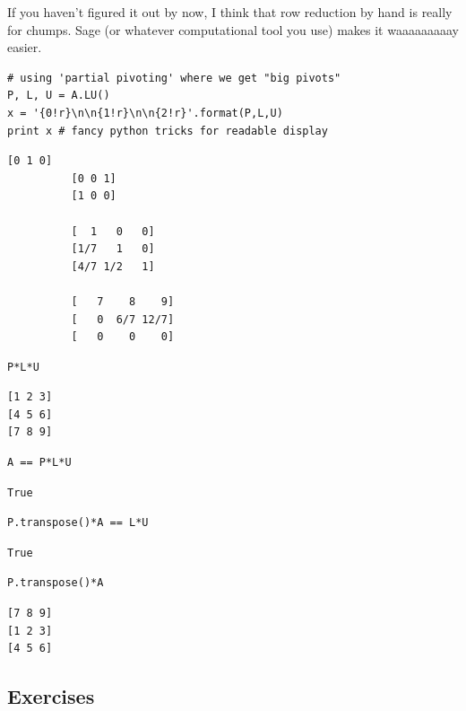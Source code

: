 \documentclass[10pt,]{book}
\theoremstyle{plain}
\theoremstyle{definition}
\numberwithin{equation}{section}
\begin{document}
        If you haven't figured it out by now, I think that row reduction by hand
        is really for chumps. Sage (or whatever computational tool you use) makes
        it waaaaaaaaay easier.
\begin{lstlisting}[style=sageinput]
# using 'partial pivoting' where we get "big pivots"
P, L, U = A.LU()
x = '{0!r}\n\n{1!r}\n\n{2!r}'.format(P,L,U)
print x # fancy python tricks for readable display
\end{lstlisting}
\begin{lstlisting}[style=sageoutput]
          [0 1 0]
          [0 0 1]
          [1 0 0]

          [  1   0   0]
          [1/7   1   0]
          [4/7 1/2   1]

          [   7    8    9]
          [   0  6/7 12/7]
          [   0    0    0]
\end{lstlisting}
\begin{lstlisting}[style=sageinput]
P*L*U
\end{lstlisting}
\begin{lstlisting}[style=sageoutput]
[1 2 3]
[4 5 6]
[7 8 9]
\end{lstlisting}
\begin{lstlisting}[style=sageinput]
A == P*L*U
\end{lstlisting}
\begin{lstlisting}[style=sageoutput]
True
\end{lstlisting}
\begin{lstlisting}[style=sageinput]
P.transpose()*A == L*U
\end{lstlisting}
\begin{lstlisting}[style=sageoutput]
True
\end{lstlisting}
\begin{lstlisting}[style=sageinput]
P.transpose()*A
\end{lstlisting}
\begin{lstlisting}[style=sageoutput]
[7 8 9]
[1 2 3]
[4 5 6]
\end{lstlisting}
\typeout{************************************************}
\typeout{************************************************}
\subsection[Exercises]{Exercises}\label{subsection-55}
\end{document}
